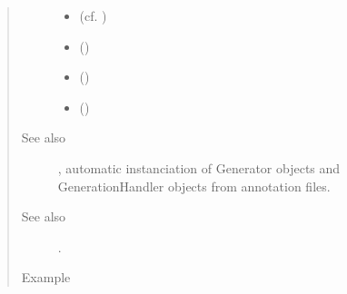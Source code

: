 \documentclass[letterpaper,10pt,english]{sphinxmanual}
\begin{document}
\begin{fulllineitems}
\begin{quote}
\begin{description}
\begin{itemize}
\item {} 
 (cf. {\hyperref[\detokenize{index:module-Transforms}]{}}) \textendash{} 

\item {} 
 (\sphinxstyleliteralemphasis{(}\sphinxstyleliteralemphasis{)}) \textendash{} 

\item {} 
 () \textendash{} 

\item {} 
 () \textendash{} 

\end{itemize}

\item[{See also}] \leavevmode
{\hyperref[\detokenize{index:module-GeneratorBuilder}]{}}, automatic instanciation of Generator objects and GenerationHandler objects from annotation files.

\item[{See also}] \leavevmode
{} .

\item[{Example}] \leavevmode
\end{description}\end{quote}


\end{fulllineitems}
\end{document}
